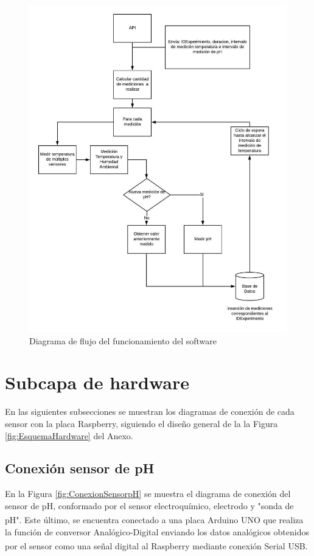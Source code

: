         \begin{figure}[H]
            \centering
            \includegraphics[scale=0.8]{hardware/DiagramadeFlujoPython.jpeg}
            \caption{Diagrama de flujo del funcionamiento del software }
            \label{FlujoPython}
        \end{figure}

\section{Subcapa de hardware}
    \par En las siguientes subsecciones se muestran los diagramas de conexión de cada sensor con la placa Raspberry, siguiendo el diseño general de la la Figura \ref{fig:EsquemaHardware} del Anexo.

    \subsection{Conexión sensor de pH}
        \par En la Figura \ref{fig:ConexionSensorpH} se muestra el diagrama de conexión del sensor de pH, conformado por el sensor electroquímico, electrodo y "sonda de pH". Este último, se encuentra conectado a una placa Arduino\textsuperscript{\textregistered} UNO que realiza la función de conversor Analógico-Digital enviando los datos analógicos obtenidos por el sensor como una señal digital al Raspberry\textsuperscript{\textregistered} mediante conexión Serial USB.
        
